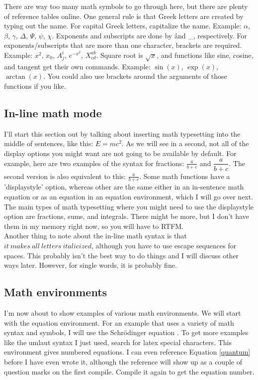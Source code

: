 \documentclass[11pt,letterpaper]{article}
\begin{document}
There are way too many math symbols to go through here, but there are plenty of
reference tables online. One general rule is that Greek letters are created by
typing out the name. For capital Greek letters, capitalize the name. Example:
$\alpha$, $\beta$, $\gamma$, $\Delta$, $\Psi$, $\psi$, $\chi$. Exponents and
subscripts are done by \^ and \_, respectively. %
For exponents/subscripts that are more than one character, brackets are
required. Example: $x^2$, $x_0$, $A^i_j$, $e^{-x^2}$, $X^{ab}_{cd}$. Square root
is $\sqrt{x}$, and functions like sine, cosine, and tangent get their own
commands. Example: $\sin(x)$, $\exp(x)$, $\arctan(x)$. You could also use
brackets around the arguments of those functions if you like.

\subsection{In-line math mode}

I'll start this section out by talking about inserting math typesetting into the
middle of sentences, like this: $E = mc^2$. As we will see in a second, not all
of the display options you might want are not going to be available by default.
For example, here are two examples of the syntax for fractions:
$\frac{a}{b + c}$ and $\dfrac{a}{b + c}$. The second version is also equivalent
to this: $\displaystyle \frac{a}{b + c}$. Some math functions have a
'displaystyle' option, whereas other are the same either in an in-sentence math
equation or as an equation in an equation environment, which I will go over
next. The main types of math typesetting where you might need to use the
displaystyle option are fractions, sums, and integrals. There might be more, but
I don't have them in my memory right now, so you will have to RTFM.\\

Another thing to note about the in-line math syntax is that $it\ makes\ all\
letters\ italicized$, although you have to use escape sequences for spaces. This
probably isn't the best way to do things and I will discuss other ways later.
However, for single words, it is probably fine.\\

\subsection{Math environments}

I'm now about to show examples of various math environments. We will start with
the equation environment. For an example that uses a variety of math syntax and
symbols, I will use the Schr\"{o}dinger equation \cite{GriffithsQM:1995}. To get
more examples like the umlaut syntax I just used, search for latex special
characters. This environment gives numbered equations. I can even reference
Equation \eqref{quantum} before I have even wrote it, although the reference
will show up as a couple of question marks on the first compile. Compile it
again to get the equation number.
\end{document}
